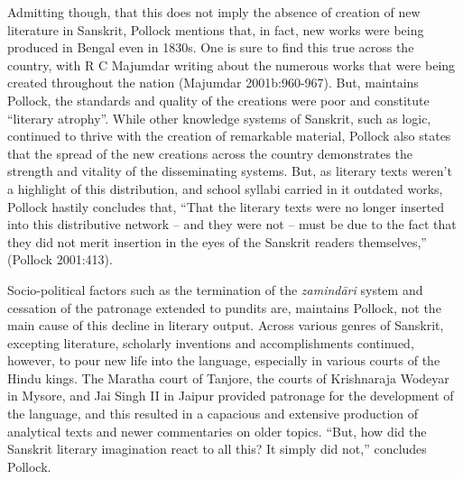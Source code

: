 Admitting though, that this does not imply the absence of creation of new literature in Sanskrit, Pollock mentions that, in fact, new works were being produced in Bengal even in 1830s. One is sure to find this true across the country, with R C Majumdar writing about the numerous works that were being created throughout the nation (Majumdar 2001b:960-967). But, maintains Pollock, the standards and quality of the creations were poor and constitute “literary atrophy”. While other knowledge systems of Sanskrit, such as logic, continued to thrive with the creation of remarkable material, Pollock also states that the spread of the new creations across the country demonstrates the strength and vitality of the disseminating systems. But, as literary texts  weren’t a highlight of this distribution, and school syllabi carried in it outdated works, Pollock hastily concludes that, “That the literary texts were no longer inserted into this distributive network – and they were not – must be due to the fact that they did not merit insertion in the eyes of the Sanskrit readers themselves,” (Pollock 2001:413).

Socio-political factors such as the termination of the {\sl zamindāri} system and cessation of the patronage extended to pundits are, maintains Pollock, not the main cause of this decline in literary output. Across various genres of Sanskrit, excepting literature, scholarly inventions and accomplishments continued, however, to pour new life into the language, especially in various courts of the Hindu kings. The Maratha court of Tanjore, the courts of Krishnaraja Wodeyar in Mysore, and Jai Singh II in Jaipur provided patronage for the development of the language, and this resulted in a capacious and extensive production of analytical texts and newer commentaries on older topics. “But, how did the Sanskrit literary imagination react to all this? It simply did not,” concludes Pollock.  

